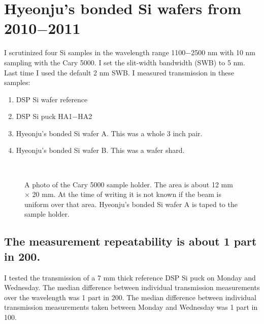 \section{Hyeonju's bonded Si wafers from 2010$-$2011}

I scrutinized four Si samples in the wavelength range 1100$-$2500 nm with 10 nm sampling with the Cary 5000.  I set the slit-width bandwidth (SWB) to 5 nm.  Last time I used the default 2 nm SWB.  I measured transmission in these samples:
\begin{enumerate}
  \item DSP Si wafer reference
  \item DSP Si puck HA1$-$HA2
  \item Hyeonju's bonded Si wafer A.  This was a whole 3 inch pair.
  \item Hyeonju's bonded Si wafer B.  This was a wafer shard.
\end{enumerate}

\begin{figure}[h!] 
\begin{center}
\ 
\caption[Cary 5000 sample size]{A photo of the Cary 5000 sample holder.  The area is about 12 mm $\times$ 20 mm.  At the time of writing it is not known if the beam is uniform over that area.  Hyeonju's bonded Si wafer A is taped to the sample holder.}
\label{fig:Cary5000sampleArea}
\end{center}
\end{figure}

\subsection{The measurement repeatability is about 1 part in 200.}

I tested the transmission of a 7 mm thick reference DSP Si puck on Monday and Wednesday.  The median difference between individual transmission measurements over the wavelength  was 1 part in 200.  The median difference between individual transmission measurements taken between Monday and Wednesday was 1 part in 100.


